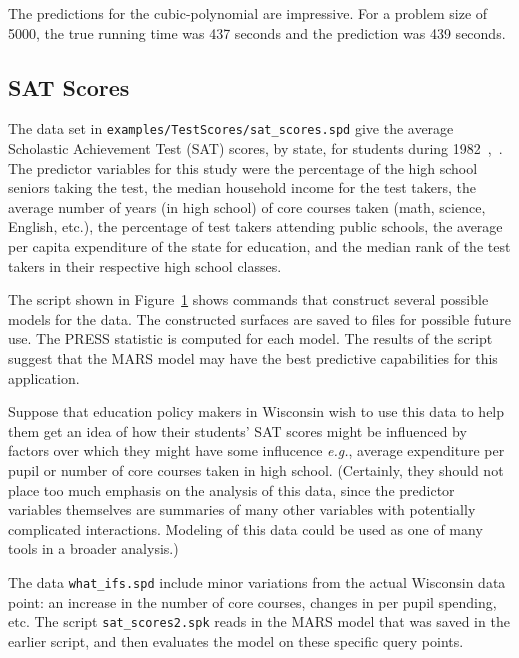 \documentclass{article}
\begin{document}
The predictions for the cubic-polynomial are impressive.  For a problem size of 5000, the true running time was 437 seconds and the prediction was 439
seconds.

\pagebreak
\subsection {SAT Scores}
The data set in \texttt{examples/TestScores/sat\_scores.spd} give the average Scholastic Achievement Test (SAT) scores, by state, for students during 1982~\cite{powell},~\cite{ramsey}.  The predictor variables for this study were the percentage of the high school seniors taking the test, the median household income for the test takers, the average number of years (in high school) of core courses taken (math, science, English, etc.), the percentage of test takers attending public schools, the average per capita expenditure of the state for education, and the median rank of the test takers in their respective high school classes. 

The script shown in Figure~\ref{fig:test_scores} shows commands that construct several possible models for the data.  The constructed surfaces are saved to files for possible future use.  The PRESS statistic is computed for each model.  The results of the script suggest that the MARS model may have the best predictive capabilities for this application. 
\begin{figure}[htbp]
  \centering
  \begin{bigbox}
	\begin{small}
 	\end{small}
  \end{bigbox}
   \label{fig:test_scores}
\end{figure}

Suppose that education policy makers in Wisconsin wish to use this data to help them get an idea of how their students' SAT scores might be influenced by factors over which they might have some influcence {\em e.g.}, average expenditure per pupil or number of core courses taken in high school.  (Certainly, they should not place too much emphasis on the analysis of this data, since the predictor variables themselves are summaries of many other variables with potentially complicated interactions.  Modeling of this data could be used as one of many tools in a broader analysis.)  

The data \texttt{what\_ifs.spd} include minor variations from the actual Wisconsin data point: an increase in the number of core courses, changes in per pupil spending, etc.  The script \texttt{sat\_scores2.spk} reads in the MARS model that was saved in the earlier script, and then evaluates the model on these specific query points.   
\end{document}
